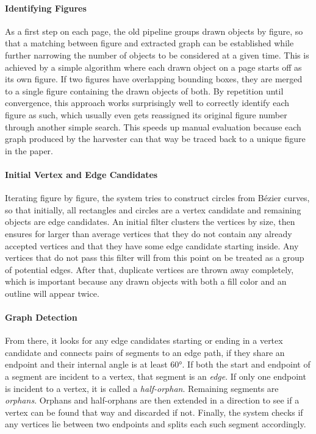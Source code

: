\documentclass[practical,english]{info1thesis}
\begin{document}
\paragraph{Identifying Figures}
As a first step on each page, the old pipeline groups drawn objects by figure, so that a matching between figure and extracted graph can be established while further narrowing the number of objects to be considered at a given time.
This is achieved by a simple algorithm where each drawn object on a page starts off as its own figure. 
If two figures have overlapping bounding boxes, they are merged to a single figure containing the drawn objects of both. 
By repetition until convergence, this approach works surprisingly well to correctly identify each figure as such, which usually even gets reassigned its original figure number through another simple search.
This speeds up manual evaluation because each graph produced by the harvester can that way be traced back to a unique figure in the paper.

\paragraph{Initial Vertex and Edge Candidates}
Iterating figure by figure, the system tries to construct circles from Bézier curves, so that initially, all rectangles and circles are a vertex candidate and remaining objects are edge candidates.
An initial filter clusters the vertices by size, then ensures for larger than average vertices that they do not contain any already accepted vertices and that they have some edge candidate starting inside.
Any vertices that do not pass this filter will from this point on be treated as a group of potential edges. 
After that, duplicate vertices are thrown away completely, which is important because any drawn objects with both a fill color and an outline will appear twice.

\paragraph{Graph Detection}
From there, it looks for any edge candidates starting or ending in a vertex candidate and connects pairs of segments to an edge path, if they share an endpoint and their internal angle is at least 60°.
If both the start and endpoint of a segment are incident to a vertex, that segment is an \emph{edge}.
If only one endpoint is incident to a vertex, it is called a \emph{half-orphan}.
Remaining segments are \emph{orphans}.
Orphans and half-orphans are then extended in a direction to see if a vertex can be found that way and discarded if not.
Finally, the system checks if any vertices lie between two endpoints and splits each such segment accordingly. 
\end{document}
